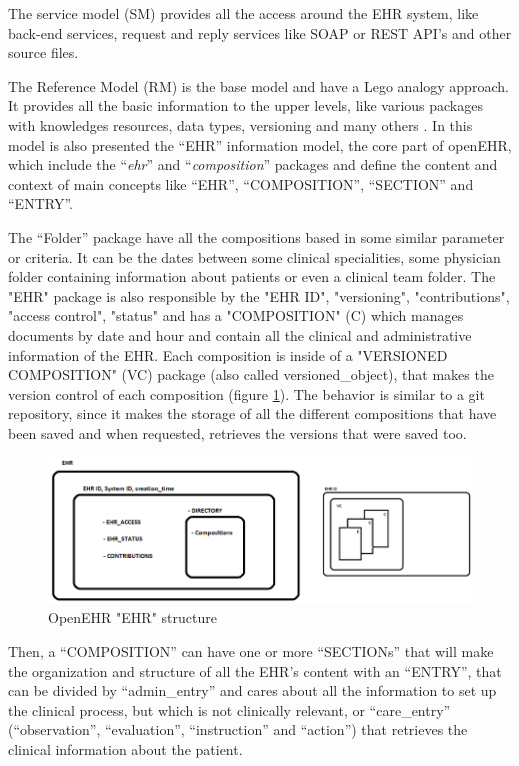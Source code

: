 \documentclass[mim_thesis.tex]{subfiles}
\begin{document}
The service model (SM) provides all the access around the EHR system, like back-end services, request and reply services like \ac{SOAP} or \ac{REST} \ac{API}’s and other source files.
	
The Reference Model (RM) is the base model and have a Lego\texttrademark{ } analogy approach. It provides all the basic information to the upper levels, like various packages with knowledges resources, data types, versioning and many others \citep{bacelar2015openehr}. In this model is also presented the “EHR” information model, the core part of openEHR, which include the “\textit{ehr}” and “\textit{composition}” packages and define the content and context of main concepts like “EHR”, “COMPOSITION”, “SECTION” and “ENTRY”.

The “Folder” package have all the compositions based in some similar parameter or criteria. It can be the dates between some clinical specialities, some physician folder containing information about patients or even a clinical team folder. The "EHR" package is also responsible by the "EHR ID", "versioning", "contributions", "access control", "status" and has a "COMPOSITION" (C) which manages documents by date and hour and contain all the clinical and administrative information of the EHR. Each composition is inside of a "VERSIONED COMPOSITION" (VC) package (also called versioned\_object), that makes the version control of each composition (figure \ref{fig:openehr_structure}). The behavior is similar to a git repository, since it makes the storage of all the different compositions that have been saved and when requested, retrieves the versions that were saved too.


\begin{figure}[H]
	\centering
    \includegraphics[width=1.1\textwidth]{img/openehr_structure.PNG}
	\caption{OpenEHR "EHR" structure}
	\label{fig:openehr_structure}
\end{figure}

Then, a “COMPOSITION” can have one or more “SECTIONs” that will make the organization and structure of all the EHR’s content with an “ENTRY”, that can be divided by “admin\_entry” and cares about all the information to set up the clinical process, but which is not clinically relevant, or “care\_entry” (“observation”, “evaluation”, “instruction” and “action”) that retrieves the clinical information about the patient.
\end{document}
